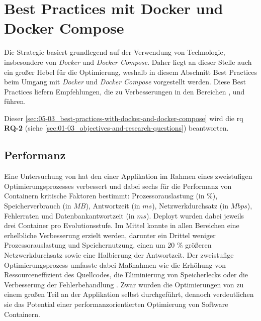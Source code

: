 \section{Best Practices mit Docker und Docker Compose}
\label{sec:05-03_best-practices-with-docker-and-docker-compose}

Die  Strategie basiert grundlegend auf der Verwendung von  Technologie, insbesondere von \textit{Docker} und \textit{Docker Compose}. Daher liegt an dieser Stelle auch ein großer Hebel für die Optimierung, weshalb in diesem Abschnitt Best Practices beim Umgang mit \textit{Docker} und \textit{Docker Compose} vorgestellt werden. Diese Best Practices liefern Empfehlungen, die zu Verbesserungen in den Bereichen ,  und  führen.

Dieser \autoref{sec:05-03_best-practices-with-docker-and-docker-compose} wird die \acrlong{rq} \textbf{RQ-2} (siehe \autoref{sec:01-03_objectives-and-research-questions}) beantworten.

\subsection{Performanz}
\label{subsec:05-03-01_performance}

Eine Untersuchung von \citeauthor{002:Optimizing-Cloud-Applications-with-DevOps} hat den  einer Applikation im Rahmen eines zweistufigen Optimierungsprozesses verbessert und dabei sechs für die Performanz von Containern kritische Faktoren bestimmt: Prozessorauslastung (in $\%$), Speicherverbrauch (in $MB$), Antwortzeit (in $ms$), Netzwerkdurchsatz (in $Mbps$), Fehlerraten und Datenbankantwortzeit (in $ms$). Deployt wurden dabei jeweils drei Container pro Evolutionsstufe. Im Mittel konnte in allen Bereichen eine erhelbliche Verbesserung erzielt werden, darunter ein Drittel weniger Prozessorauslastung und Speichernutzung, einen um 20 \% größeren Netzwerkdurchsatz sowie eine Halbierung der Antwortzeit. Der zweistufige Optimierungsprozess umfasste dabei Maßnahmen wie die Erhöhung von Ressourceneffizient des Quellcodes, die Eliminierung von Speicherlecks oder die Verbesserung der Fehlerbehandlung \cite{002:Optimizing-Cloud-Applications-with-DevOps}. Zwar wurden die Optimierungen von \citeauthor{002:Optimizing-Cloud-Applications-with-DevOps} zu einem großen Teil an der Applikation selbst durchgeführt, dennoch verdeutlichen sie das Potential einer performanzorientierten Optimierung von Software Containern.

